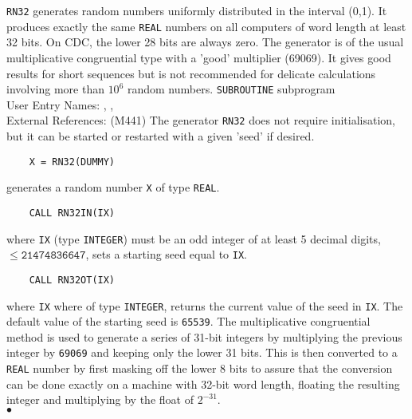                           
                        
\Submitter{}                             
{\tt RN32} generates random numbers uniformly distributed in the
interval (0,1). It produces exactly the same {\tt REAL} numbers on all
computers of word length at least 32 bits. On CDC, the lower 28 bits are
always zero. The generator is of the usual multiplicative congruential
type with a 'good' multiplier (69069). It gives good results for short
sequences but is not recommended for delicate calculations involving
more than $10^6$ random numbers.
\Structure
{\tt SUBROUTINE} subprogram  \\
User Entry Names: , , \\
External References:  (M441)
\Usage
The generator {\tt RN32} does not require initialisation, but it can be
started or restarted with a given 'seed' if desired.
\begin{verbatim}
    X = RN32(DUMMY)
\end{verbatim}
generates a random number {\tt X} of type {\tt REAL}.
\begin{verbatim}
    CALL RN32IN(IX)
\end{verbatim}
where {\tt IX} (type {\tt INTEGER}) must be an odd integer of at least 5
decimal digits, $\mathtt{\leq 21474836647}$, sets a starting seed equal
to {\tt IX}.
\begin{verbatim}
    CALL RN32OT(IX)
\end{verbatim}
where {\tt IX} where of type {\tt INTEGER}, returns the current value of
the seed in {\tt IX}.
\Method
The default value of the starting seed is {\tt 65539}.
The multiplicative congruential method is used to generate a series of
31-bit integers by multiplying the previous integer by {\tt 69069} and
keeping only the lower 31 bits. This is then converted to a {\tt REAL}
number by first masking off the lower 8 bits to assure that the
conversion can be done exactly on a machine with 32-bit word length,
floating the resulting integer and multiplying by the float of $2^{-31}$.
\\ $\bullet$
